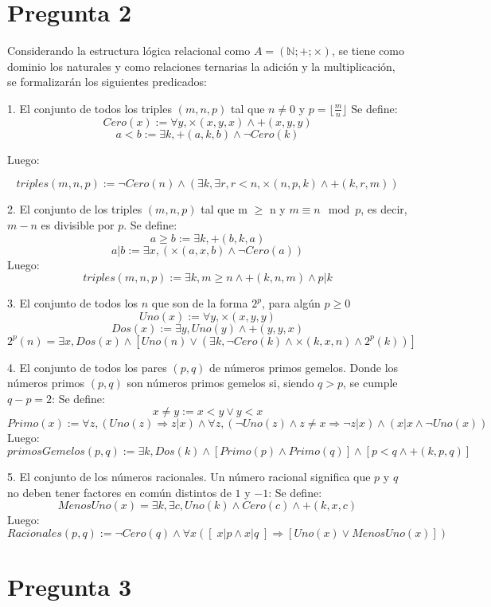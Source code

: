 \documentclass[
	spanish, %
	letterpaper, oneside
]{article}
\begin{document}
\newpage
\section*{Pregunta 2}

Considerando la estructura lógica relacional como $A=(\mathbb{N};+;\times)$, se tiene como dominio los naturales y como relaciones ternarias la adición y la multiplicación, se formalizarán los siguientes predicados:

1. El conjunto de todos los triples $(m,n,p)$ tal que $n\neq 0$ y $p = \lfloor \frac{m}{n}\rfloor$
Se define:
$$Cero(x):=\forall y, \times(x,y,x) \land +(x,y,y)$$
$$a<b := \exists k, +(a,k,b)\land \neg Cero(k)$$

Luego:

$$triples(m,n,p):=\neg Cero(n) \land (\exists k, \exists r, r<n, \times(n,p,k) \land +(k,r,m))$$

2. El conjunto de los triples $(m,n,p)$ tal que m $\geq$ n y $m \equiv n \mod p$, es decir, $m-n$ es divisible por $p$.
Se define:
$$a\geq b := \exists k, +(b,k,a)$$    %
 $$a|b := \exists x,(\times(a,x,b)\land \neg Cero(a))$$
 Luego:
 $$triples(m,n,p):= \exists k, m\geq n \land +(k,n,m) \land p|k$$


 3. El conjunto de todos los $n$ que son de la forma $2^p$, para algún $p\geq 0$
 $$Uno(x):=\forall y, \times(x,y,y)$$
 $$Dos(x):=\exists y, Uno(y) \land +(y,y,x)$$
 $$2^p(n)= \exists x, Dos(x) \land [Uno(n)\vee (\exists k,\neg Cero(k) \land \times(k,x,n)\land 2^p(k))]$$

 4. El conjunto de todos los pares $(p,q)$ de números primos gemelos. Donde los números primos $(p,q)$ son números primos gemelos si, siendo $q>p$, se cumple $q-p=2$:
Se define:
$$x \neq y := x < y \vee y < x$$
 $$Primo(x):=\forall z,(Uno(z) \Rightarrow z|x ) \wedge \forall z, (\neg Uno(z)\wedge z\neq x \Rightarrow \neg z|x ) \wedge (x|x \wedge \neg Uno(x))$$
Luego:
 $$primosGemelos(p,q) := \exists k, Dos(k) \land [Primo(p) \land Primo(q)] \land [p < q \land +(k,p,q)]$$



 5. El conjunto de los números racionales. Un número racional significa que $p$ y $q$ no deben tener factores en común distintos de $1$ y $-1$:
Se define:
$$MenosUno(x) = \exists k,\exists c, Uno(k) \land Cero(c) \land +(k,x,c)$$
Luego:
$$Racionales(p, q) := \neg Cero(q) \land \forall x([\;x|p \land x|q\;] \Rightarrow [Uno(x)\vee 
 MenosUno(x)])$$


\newpage
\section*{Pregunta 3}
\end{document}
